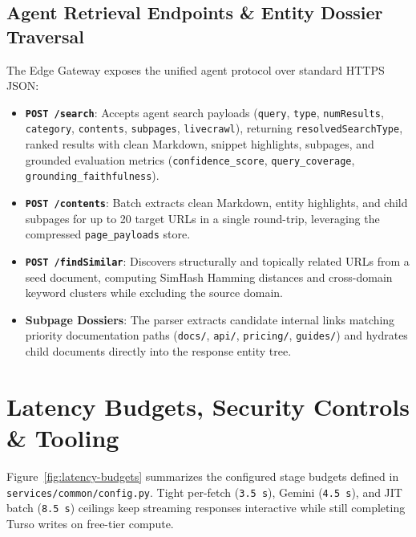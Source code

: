 \documentclass[10pt,a4paper]{article}
\begin{document}
\subsection{Agent Retrieval Endpoints \& Entity Dossier Traversal}
The Edge Gateway exposes the unified agent protocol over standard HTTPS JSON:
\begin{itemize}
    \item \textbf{\texttt{POST /search}}: Accepts agent search payloads (\texttt{query}, \texttt{type}, \texttt{numResults}, \texttt{category}, \texttt{contents}, \texttt{subpages}, \texttt{livecrawl}), returning \texttt{resolvedSearchType}, ranked results with clean Markdown, snippet highlights, subpages, and grounded evaluation metrics (\texttt{confidence\_score}, \texttt{query\_coverage}, \texttt{grounding\_faithfulness}).
    \item \textbf{\texttt{POST /contents}}: Batch extracts clean Markdown, entity highlights, and child subpages for up to 20 target URLs in a single round-trip, leveraging the compressed \texttt{page\_payloads} store.
    \item \textbf{\texttt{POST /findSimilar}}: Discovers structurally and topically related URLs from a seed document, computing SimHash Hamming distances and cross-domain keyword clusters while excluding the source domain.
    \item \textbf{Subpage Dossiers}: The parser extracts candidate internal links matching priority documentation paths (\texttt{docs/}, \texttt{api/}, \texttt{pricing/}, \texttt{guides/}) and hydrates child documents directly into the response entity tree.
\end{itemize}

\clearpage
\section{Latency Budgets, Security Controls \& Tooling}

Figure~\ref{fig:latency-budgets} summarizes the configured stage budgets defined in \texttt{services/common/config.py}. Tight per-fetch (\texttt{3.5\,s}), Gemini (\texttt{4.5\,s}), and JIT batch (\texttt{8.5\,s}) ceilings keep streaming responses interactive while still completing Turso writes on free-tier compute.
\end{document}
